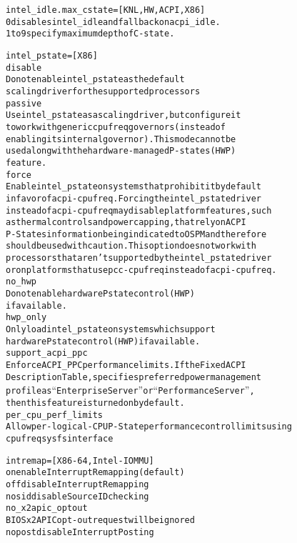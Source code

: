 \documentclass[a4paper,8pt,english]{sphinxmanual}
\begin{document}
\begin{alltt}
        intel\_idle.max\_cstate=  {[}KNL,HW,ACPI,X86{]}
                        0       disables intel\_idle and fall back on acpi\_idle.
                        1 to 9  specify maximum depth of C-state.

        intel\_pstate=  {[}X86{]}
                       disable
                         Do not enable intel\_pstate as the default
                         scaling driver for the supported processors
                       passive
                         Use intel\_pstate as a scaling driver, but configure it
                         to work with generic cpufreq governors (instead of
                         enabling its internal governor).  This mode cannot be
                         used along with the hardware-managed P-states (HWP)
                         feature.
                       force
                         Enable intel\_pstate on systems that prohibit it by default
                         in favor of acpi-cpufreq. Forcing the intel\_pstate driver
                         instead of acpi-cpufreq may disable platform features, such
                         as thermal controls and power capping, that rely on ACPI
                         P-States information being indicated to OSPM and therefore
                         should be used with caution. This option does not work with
                         processors that aren't supported by the intel\_pstate driver
                         or on platforms that use pcc-cpufreq instead of acpi-cpufreq.
                       no\_hwp
                         Do not enable hardware P state control (HWP)
                         if available.
                hwp\_only
                        Only load intel\_pstate on systems which support
                        hardware P state control (HWP) if available.
                support\_acpi\_ppc
                        Enforce ACPI \_PPC performance limits. If the Fixed ACPI
                        Description Table, specifies preferred power management
                        profile as ``Enterprise Server'' or ``Performance Server'',
                        then this feature is turned on by default.
                per\_cpu\_perf\_limits
                        Allow per-logical-CPU P-State performance control limits using
                        cpufreq sysfs interface

        intremap=       {[}X86-64, Intel-IOMMU{]}
                        on      enable Interrupt Remapping (default)
                        off     disable Interrupt Remapping
                        nosid   disable Source ID checking
                        no\_x2apic\_optout
                                BIOS x2APIC opt-out request will be ignored
                        nopost  disable Interrupt Posting


\end{alltt}
\end{document}

